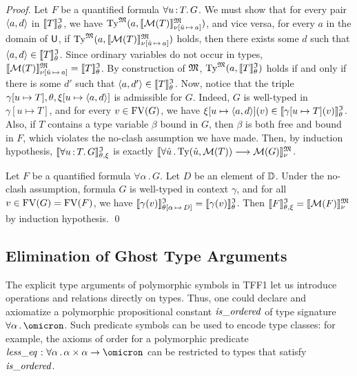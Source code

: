 \begin{proof}
Let $F$ be a quantified formula $\forall u \operatorname{:} T .\, G$.
We must show that for every pair $\langle a,d \rangle$ in $\llbracket T\rrbracket^{\mathfrak{I}}_{\theta}$, we have
$\mathrm{Ty}^{\mathfrak{M}}(a, \llbracket \mathcal{M}(T) \rrbracket^{\mathfrak{M}}_{\nu[\hat{u}\,\mapsto\,a]})$,
and vice versa, for every $a$ in the domain of $\mathsf{U}$, if
$\mathrm{Ty}^{\mathfrak{M}}(a, \llbracket \mathcal{M}(T) \rrbracket^{\mathfrak{M}}_{\nu[\hat{u}\,\mapsto\,a]})$
holds, then there exists some $d$ such that $\langle a,d \rangle \in
\llbracket T\rrbracket^{\mathfrak{I}}_{\theta}$.
%
Since ordinary variables do not occur in types,
$\llbracket \mathcal{M}(T) \rrbracket^{\mathfrak{M}}_{\nu[\hat{u}\,\mapsto\,a]} =
\llbracket T \rrbracket^{\mathfrak{I}}_\theta$.
By construction of $\mathfrak{M}$,
$\mathrm{Ty}^{\mathfrak{M}}(a, \llbracket T \rrbracket^{\mathfrak{I}}_\theta)$
holds if and only if there is some $d'$ such that
$\langle a,d' \rangle \in \llbracket T \rrbracket^{\mathfrak{I}}_\theta$.
%
Now, notice that the triple $\gamma[u \mapsto T],
\theta,\xi[u \mapsto \langle a,d \rangle]$ is admissible for $G$.
Indeed, $G$ is well-typed in $\gamma[u \mapsto T]$,
and for every $v \in \mathrm{FV}(G)$, we have
$\xi[u \mapsto \langle a,d \rangle](v) \in \llbracket\gamma[u \mapsto T](v)\rrbracket^{\mathfrak{I}}_{\theta}$.
Also, if $T$ contains a type variable $\beta$ bound in $G$,
then $\beta$ is both free and bound in $F$, which violates
the no-clash assumption we have made.
%
Then, by induction hypothesis, $\llbracket\forall u \operatorname{:} T .\, G\rrbracket^{\mathfrak{I}}_{\theta,\xi}$
is exactly $\llbracket \forall \hat{u} \,.\, \mathrm{Ty}(\hat{u},\mathcal{M}(T))
\longrightarrow \mathcal{M}(G) \rrbracket^{\mathfrak{M}}_{\nu}$.

Let $F$ be a quantified formula $\forall \alpha \,.\, G$.
Let $D$ be an element of $\mathbb{D}$. Under the no-clash assumption,
formula $G$ is well-typed in context $\gamma$, and for all
$v \in \mathrm{FV}(G) = \mathrm{FV}(F)$, we have
$\llbracket\gamma(v)\rrbracket^{\mathfrak{I}}_{\theta[\alpha\,\mapsto\,D]} = \llbracket\gamma(v)\rrbracket^{\mathfrak{I}}_{\theta}$.
Then $\llbracket F\rrbracket^{\mathfrak{I}}_{\theta,\xi} = \llbracket \mathcal{M}(F) \rrbracket^{\mathfrak{M}}_{\nu}$ by induction hypothesis.
\qed
\end{proof}

\subsection{Elimination of Ghost Type Arguments} \label{ssec:ghost}
The explicit type arguments of polymorphic symbols
in TFF1 let us introduce operations and relations directly on types.
Thus, one could declare and axiomatize a polymorphic propositional
constant $\mathit{is\_ordered}$ of type signature $\forall\alpha\,.\,\omicron$.
Such predicate symbols can be used to encode type classes:
for example, the axioms of order for a polymorphic predicate
$\sym{less\_eq} \,\ty\, \forall\alpha\,.\,\alpha\times\alpha\to\omicron$
can be restricted to types that satisfy $\mathit{is\_ordered}$.


